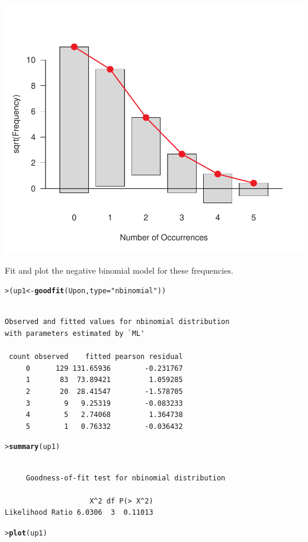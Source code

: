 \documentclass[10pt]{report}\usepackage[]{graphicx}\usepackage[]{color}
\makeatletter
\newcommand{\hlstr}[1]{\textcolor[rgb]{0.192,0.494,0.8}{#1}}%
\newcommand{\hlstd}[1]{\textcolor[rgb]{0.345,0.345,0.345}{#1}}%
\newcommand{\hlkwb}[1]{\textcolor[rgb]{0.69,0.353,0.396}{#1}}%
\newcommand{\hlkwc}[1]{\textcolor[rgb]{0.333,0.667,0.333}{#1}}%
\newcommand{\hlkwd}[1]{\textcolor[rgb]{0.737,0.353,0.396}{\textbf{#1}}}%
\newenvironment{kframe}{%
 \def\at@end@of@kframe{}%
 \ifinner\ifhmode%
  \def\at@end@of@kframe{\end{minipage}}%
  \begin{minipage}{\columnwidth}%
 \fi\fi%
 \def\FrameCommand##1{\hskip\@totalleftmargin \hskip-\fboxsep
 \colorbox{shadecolor}{##1}\hskip-\fboxsep
     \hskip-\linewidth \hskip-\@totalleftmargin \hskip\columnwidth}%
 \MakeFramed {\advance\hsize-\width
   \@totalleftmargin\z@ \linewidth\hsize
   \@setminipage}}%
 {\par\unskip\endMakeFramed%
 \at@end@of@kframe}
\newenvironment{knitrout}{}{} %
\renewenvironment{knitrout}{\small\renewcommand{\baselinestretch}{.85}}{} %
\makeatother
\begin{document}
\begin{Exercises}
\begin{enumerate*}
\begin{ans}
\begin{knitrout}
\centerline{\includegraphics[width=.5\textwidth]{soln/fig/ex3_6b-1} }



\end{knitrout}
    \end{ans}
    
    \item Fit and plot the negative binomial model for these frequencies.
    \begin{ans}
\begin{knitrout}\footnotesize
{}\color{fgcolor}\begin{kframe}
\begin{alltt}
\hlstd{> }\hlstd{(up1} \hlkwb{<-} \hlkwd{goodfit}\hlstd{(Upon,} \hlkwc{type}\hlstd{=}\hlstr{"nbinomial"}\hlstd{))}
\end{alltt}
\begin{verbatim}

Observed and fitted values for nbinomial distribution
with parameters estimated by `ML' 

 count observed    fitted pearson residual
     0      129 131.65936        -0.231767
     1       83  73.89421         1.059285
     2       20  28.41547        -1.578705
     3        9   9.25319        -0.083233
     4        5   2.74068         1.364738
     5        1   0.76332        -0.036432
\end{verbatim}
\begin{alltt}
\hlstd{> }\hlkwd{summary}\hlstd{(up1)}
\end{alltt}
\begin{verbatim}

	 Goodness-of-fit test for nbinomial distribution

                    X^2 df P(> X^2)
Likelihood Ratio 6.0306  3  0.11013
\end{verbatim}
\begin{alltt}
\hlstd{> }\hlkwd{plot}\hlstd{(up1)}
\end{alltt}
\end{kframe}


\end{knitrout}
\end{ans}
\end{enumerate*}
\end{Exercises}
\end{document}
